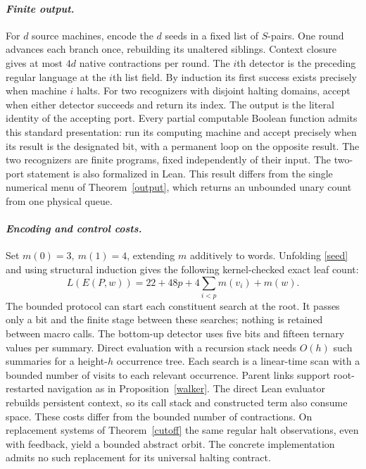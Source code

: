\paragraph{\textit{Finite output.}}
For \(d\) source machines, encode the \(d\) seeds in a fixed list of \(S\)-pairs. One round advances each branch once, rebuilding its unaltered siblings. Context closure gives at most \(4d\) native contractions per round. The \(i\)th detector is the preceding regular language at the \(i\)th list field. By induction its first success exists precisely when machine \(i\) halts. For two recognizers with disjoint halting domains, accept when either detector succeeds and return its index. The output is the literal identity of the accepting port. Every partial computable Boolean function admits this standard presentation: run its computing machine and accept precisely when its result is the designated bit, with a permanent loop on the opposite result. The two recognizers are finite programs, fixed independently of their input. The two-port statement is also formalized in Lean. This result differs from the single numerical menu of Theorem~\ref{output}, which returns an unbounded unary count from one physical queue.

\paragraph{\textit{Encoding and control costs.}}
Set \(m(0)=3,\ m(1)=4\), extending \(m\) additively to words. Unfolding \eqref{seed} and using structural induction gives the following kernel-checked exact leaf count:
\[
 L(E(P,w))=22+48p+4\sum_{i<p}m(v_i)+m(w).
\]
The bounded protocol can start each constituent search at the root. It passes only a bit and the finite stage between these searches; nothing is retained between macro calls. The bottom-up detector uses five bits and fifteen ternary values per summary. Direct evaluation with a recursion stack needs \(O(h)\) such summaries for a height-\(h\) occurrence tree. Each search is a linear-time scan with a bounded number of visits to each relevant occurrence. Parent links support root-restarted navigation as in Proposition~\ref{walker}. The direct Lean evaluator rebuilds persistent context, so its call stack and constructed term also consume space. These costs differ from the bounded number of contractions. On replacement systems of Theorem~\ref{cutoff} the same regular halt observations, even with feedback, yield a bounded abstract orbit. The concrete implementation admits no such replacement for its universal halting contract.
